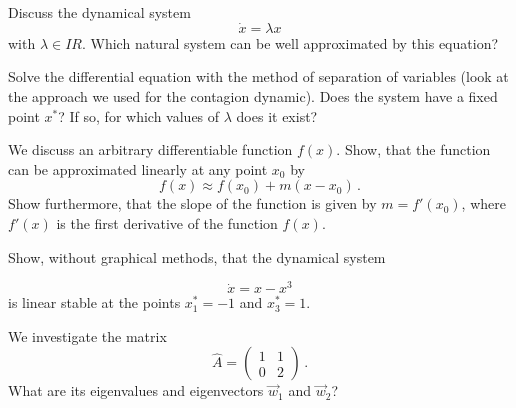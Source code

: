  \exercise[topic=Linear Stability
 ]
  \subexercise
  
  
  Discuss the dynamical system
  \begin{equation}
      \dot x = \lambda x
  \end{equation}
  with $\lambda\in I\!\!R$. Which natural system can be well approximated by this equation?

Solve the differential equation with the method of separation of variables (look at the approach we used for the contagion dynamic). Does the system have a fixed point $x^*$? If so, for which values of   $\lambda$ does it exist?

  \subexercise
  
  We discuss an arbitrary differentiable function $f(x)$. Show, that the function can be approximated linearly at any point $x_0$ by 
    \begin{equation}
      f(x) \approx f(x_0) + m(x-x_0)\,.
  \end{equation}
  Show furthermore, that the slope of the function is given by $m=f'(x_0)$, where $f'(x)$ is the first derivative of the function $f(x)$. 

  \subexercise
  
  Show, without graphical methods, that the dynamical system 
  
  \begin{equation}
      \dot x = x-x^3
  \end{equation}
is linear stable at the points $x^*_1=-1$ and $x^*_3=1$.

  \exercise[topic=Eigenwerte und Eigenvektoren]
  \subexercise
We investigate the matrix
  \begin{equation}
      \hat A = \begin{pmatrix} 1 & 1 \\ 0 & 2\end{pmatrix}\,.
  \end{equation}
What are its eigenvalues and eigenvectors $\vec w_1$ and
  $\vec w_2$?
  
